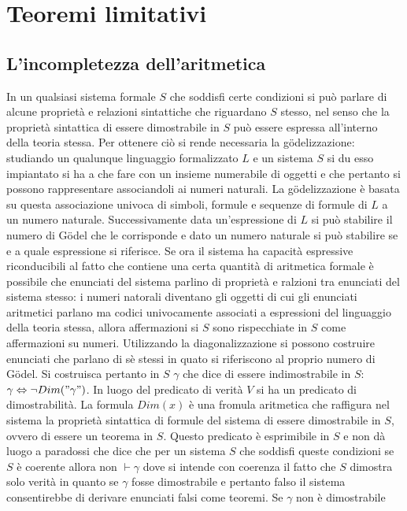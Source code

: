 \section{Teoremi limitativi}
\subsection{L'incompletezza dell'aritmetica}
In un qualsiasi sistema formale $S$ che soddisfi certe condizioni si pu\`o parlare di alcune propriet\`a e relazioni sintattiche che riguardano $S$ stesso, 
nel senso che la propriet\`a sintattica di essere dimostrabile in $S$ pu\`o essere espressa all'interno della teoria stessa. Per ottenere ci\`o si rende 
necessaria la g\"odelizzazione: studiando un qualunque linguaggio formalizzato $L$ e un sistema $S$ si du esso impiantato si ha a che fare con un insieme 
numerabile di oggetti e che pertanto si possono rappresentare associandoli ai numeri naturali. La g\"odelizzazione \`e basata su questa associazione univoca
di simboli, formule e sequenze di formule di $L$ a un numero naturale. Successivamente data un'espressione di $L$ si pu\`o stabilire il numero di G\"odel
che le corrisponde e dato un numero naturale si pu\`o stabilire se e a quale espressione si riferisce. Se ora il sistema ha capacit\`a espressive 
riconducibili al fatto che contiene una certa quantit\`a di aritmetica formale \`e possibile che enunciati del sistema parlino di propriet\`a e ralzioni tra
enunciati del sistema stesso: i numeri natorali diventano gli oggetti di cui gli enunciati aritmetici parlano ma codici univocamente associati a espressioni
del linguaggio della teoria stessa, allora affermazioni si $S$ sono rispecchiate in $S$ come affermazioni su numeri. Utilizzando la diagonalizzazione si 
possono costruire enunciati che parlano di s\`e stessi in quato si riferiscono al proprio numero di G\"odel. Si costruisca pertanto in $S$ $\gamma$ che
dice di essere indimostrabile in $S$: $\gamma\Leftrightarrow\neg Dim("\gamma")$. In luogo del predicato di verit\`a $V$ si ha un predicato di 
dimostrabilit\`a. La formula $Dim(x)$ \`e una fromula aritmetica che raffigura nel sistema la propriet\`a sintattica di formule del sistema di essere
dimostrabile in $S$, ovvero di essere un teorema in $S$. Questo predicato \`e esprimibile in $S$ e non d\`a luogo a paradossi che dice che per un sistema
$S$ che soddisfi queste condizioni se $S$ \`e coerente allora non $\vdash\gamma$ dove si intende con coerenza il fatto che $S$ dimostra solo verit\`a in 
quanto se $\gamma$ fosse dimostrabile e pertanto falso il sistema consentirebbe di derivare enunciati falsi come teoremi. Se $\gamma$ non \`e dimostrabile
